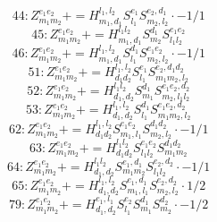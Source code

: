 \documentclass[letterpaper,10pt,fleqn,leqno,onecolumn]{article}
\begin{document}
\begin{equation} \;\;\;\;\;\;  44: Z^{e_{1}e_{2}}_{m_{1}m_{2}}+=H^{l_{1},l_{2}}_{m_{1},d_{1}}S^{e_{1}}_{l_{1}}S^{e_{2},d_{1}}_{m_{2},l_{2}}\cdot -1/1 \end{equation}
\begin{equation} \;\;\;\;\;\;  45: Z^{e_{1}e_{2}}_{m_{1}m_{2}}+=H^{l_{1}l_{2}}_{m_{1},d_{1}}S^{d_{1}}_{m_{2}}S^{e_{1}e_{2}}_{l_{1}l_{2}} \end{equation}
\begin{equation} \;\;\;\;\;\;  46: Z^{e_{1}e_{2}}_{m_{1}m_{2}}+=H^{l_{1},l_{2}}_{m_{1},d_{1}}S^{d_{1}}_{l_{1}}S^{e_{1}e_{2}}_{m_{2},l_{2}}\cdot -1/1 \end{equation}
\begin{equation} \;\;\;\;\;\;  51: Z^{e_{1}e_{2}}_{m_{1}m_{2}}+=H^{l_{1},l_{2}}_{d_{1}d_{2}}S^{e_{1}}_{l_{1}}S^{e_{2},d_{1}d_{2}}_{m_{1}m_{2},l_{2}} \end{equation}
\begin{equation} \;\;\;\;\;\;  52: Z^{e_{1}e_{2}}_{m_{1}m_{2}}+=H^{l_{1}l_{2}}_{d_{1},d_{2}}S^{d_{1}}_{m_{1}}S^{e_{1}e_{2},d_{2}}_{m_{2},l_{1}l_{2}} \end{equation}
\begin{equation} \;\;\;\;\;\;  53: Z^{e_{1}e_{2}}_{m_{1}m_{2}}+=H^{l_{1},l_{2}}_{d_{1},d_{2}}S^{d_{1}}_{l_{1}}S^{e_{1}e_{2},d_{2}}_{m_{1}m_{2},l_{2}} \end{equation}
\begin{equation} \;\;\;\;\;\;  62: Z^{e_{1}e_{2}}_{m_{1}m_{2}}+=H^{l_{1},l_{2}}_{d_{1}d_{2}}S^{e_{1}e_{2}}_{m_{1},l_{1}}S^{d_{1}d_{2}}_{m_{2},l_{2}}\cdot -1/1 \end{equation}
\begin{equation} \;\;\;\;\;\;  63: Z^{e_{1}e_{2}}_{m_{1}m_{2}}+=H^{l_{1}l_{2}}_{d_{1}d_{2}}S^{e_{1}e_{2}}_{l_{1}l_{2}}S^{d_{1}d_{2}}_{m_{1}m_{2}} \end{equation}
\begin{equation} \;\;\;\;\;\;  64: Z^{e_{1}e_{2}}_{m_{1}m_{2}}+=H^{l_{1}l_{2}}_{d_{1},d_{2}}S^{e_{1},d_{1}}_{m_{1}m_{2}}S^{e_{2},d_{2}}_{l_{1}l_{2}}\cdot -1/1 \end{equation}
\begin{equation} \;\;\;\;\;\;  65: Z^{e_{1}e_{2}}_{m_{1}m_{2}}+=H^{l_{1},l_{2}}_{d_{1},d_{2}}S^{e_{1},d_{1}}_{m_{1},l_{1}}S^{e_{2},d_{2}}_{m_{2},l_{2}}\cdot 1/2 \end{equation}
\begin{equation} \;\;\;\;\;\;  79: Z^{e_{1}e_{2}}_{m_{1}m_{2}}+=H^{e_{1},l_{1}}_{d_{1},d_{2}}S^{e_{2}}_{l_{1}}S^{d_{1}}_{m_{1}}S^{d_{2}}_{m_{2}}\cdot -1/2 \end{equation}
\end{document}
